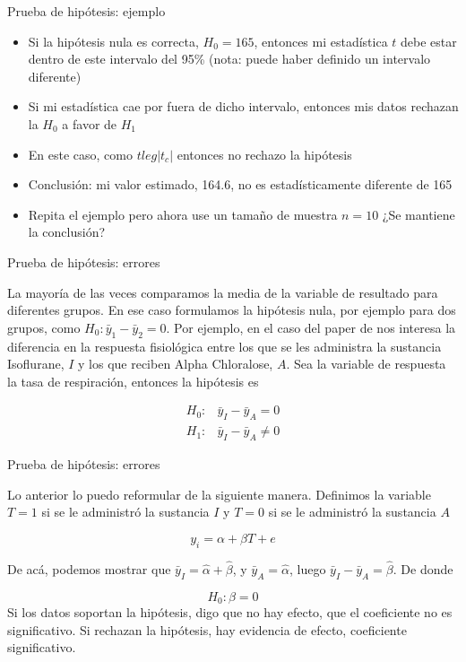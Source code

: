 \documentclass{beamer}
\begin{document}
\begin{frame}{Prueba de hipótesis: ejemplo}

\begin{itemize}
    \item Si la hipótesis nula es correcta, $H_0=165$, entonces mi estadística $t$ debe estar dentro de este intervalo del 95\% (nota: puede haber definido un intervalo diferente)
    \item Si mi estadística cae por fuera de dicho intervalo, entonces mis datos rechazan la $H_0$ a favor de $H_1$
    \item En este caso, como $t leg|t_c|$ entonces no rechazo la hipótesis
    \item Conclusión: mi valor estimado, 164.6, no es estadísticamente diferente de 165
    \item Repita el ejemplo pero ahora use un tamaño de muestra $n=10$ ¿Se mantiene la conclusión?
\end{itemize}
    
\end{frame}

\begin{frame}{Prueba de hipótesis: errores}

La mayoría de las veces comparamos la media de la variable de resultado para diferentes grupos. En ese caso formulamos la hipótesis nula, por ejemplo para dos grupos, como $H_0: \bar{y}_1-\bar{y}_2=0$. Por ejemplo, en el caso del paper de \cite{low_mouse} nos interesa la diferencia en la respuesta fisiológica entre los que se les administra la sustancia Isoflurane, $I$ y los que reciben Alpha Chloralose, $A$. Sea la variable de respuesta la tasa de respiración, entonces la hipótesis es

\begin{align*}
    H_0:& \bar{y}_I-\bar{y}_A=0\\
    H_1:& \bar{y}_I-\bar{y}_A \neq 0
\end{align*}
    
\end{frame}

\begin{frame}{Prueba de hipótesis: errores}

Lo anterior lo puedo reformular de la siguiente manera. Definimos la variable $T=1$ si se le administró la sustancia $I$ y $T=0$ si se le administró la sustancia $A$

\begin{equation*}
    y_i=\alpha+\beta T+ e
\end{equation*}

De acá, podemos mostrar que $\bar{y}_I=\hat{\alpha}+\hat{\beta}$,  y $\bar{y}_A=\hat{\alpha}$, luego $\bar{y}_I-\bar{y}_A=\hat{\beta}$. De donde

\begin{equation*}
    H_0:\beta=0
\end{equation*}
    Si los datos soportan la hipótesis, digo que no hay efecto, que el coeficiente no es significativo. Si rechazan la hipótesis, hay evidencia de efecto, coeficiente significativo.
\end{frame}
\end{document}
